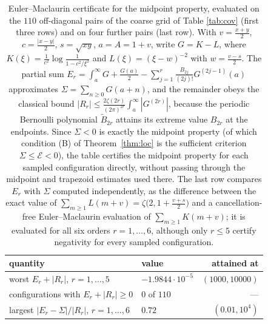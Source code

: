 \begin{table}[htbp]\centering\small
\caption{Euler--Maclaurin certificate for the midpoint property, evaluated on the
$110$ off-diagonal pairs of the coarse grid of Table \ref{tab:cov} (first three rows)
and on four further pairs (last row). With
$v=\frac{x+y}{2}$, $c=\frac{|x-y|}{2}$, $s=\sqrt{xy}$, $a=A=1+v$, write
$G=K-L$, where $K(\xi)=\frac{1}{c^{2}}\log\frac{1}{1-c^{2}/\xi^{2}}$ and
$L(\xi)=(\xi-w)^{-2}$ with $w=\frac{v-s}{2}$. The partial sum
$E_r=\int_{a}^{\infty}G+\frac{G(a)}{2}-\sum_{j=1}^{r}\frac{B_{2j}}{(2j)!}G^{(2j-1)}(a)$
approximates $\Sigma=\sum_{n\ge0}G(a+n)$, and the remainder obeys the classical
bound $|R_r|\le\frac{2\zeta(2r)}{(2\pi)^{2r}}\int_{a}^{\infty}|G^{(2r)}|$,
because the periodic Bernoulli polynomial $\tilde B_{2r}$ attains its extreme
value $B_{2r}$ at the endpoints. Since $\Sigma<0$ is exactly the midpoint property (of
which condition (B) of Theorem~\ref{thm:loc} is the sufficient criterion
$\Sigma\le\mathcal{E}<0$), the table certifies the midpoint property for each sampled
configuration directly, without passing through the midpoint and trapezoid estimates used
there. The last row compares
$E_r$ with $\Sigma$ computed independently, as the difference between the
exact value of $\sum_{m\ge1}L(m+v)=\zeta\big(2,1+\frac{v+s}{2}\big)$ and a
cancellation-free Euler--Maclaurin evaluation of $\sum_{m\ge1}K(m+v)$; it is
evaluated for all six orders $r=1,\dots,6$, although only $r\le5$ certify negativity
for every sampled configuration.}
\label{tab:em}
\begin{tabular}{llr}
\toprule
quantity & value & attained at\\
\midrule
worst $E_r+|R_r|$, $r=1,\dots,5$ & $-1.9844\cdot10^{-5}$ & $(1000,10000)$\\
configurations with $E_r+|R_r|\ge0$ & $0$ of $110$ & ---\\
largest $|E_r-\Sigma|/|R_r|$, $r=1,\dots,6$ & $0.72$ & $(0.01,10^{4})$\\
\bottomrule
\end{tabular}
\end{table}

